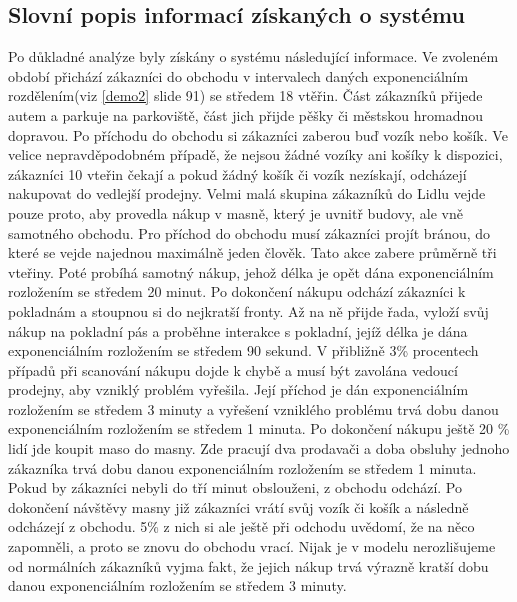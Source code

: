 \documentclass[12pt,a4paper,titlepage]{article}
\begin{document}
\subsection{Slovní popis informací získaných o systému}
Po důkladné analýze byly získány o systému následující informace. Ve zvoleném období přichází zákazníci do obchodu v intervalech daných exponenciálním rozdělením(viz \ref{demo2} slide 91) se středem 18 vtěřin. Část zákazníků přijede autem a parkuje na parkoviště, část jich přijde pěšky či městskou hromadnou dopravou. Po příchodu do obchodu si zákazníci zaberou buď vozík nebo košík. Ve velice nepravděpodobném případě, že nejsou žádné vozíky ani košíky k dispozici, zákazníci 10 vteřin čekají a pokud žádný košík či vozík nezískají, odcházejí nakupovat do vedlejší prodejny. Velmi malá skupina zákazníků do Lidlu vejde pouze proto, aby provedla nákup v masně, který je uvnitř budovy, ale vně samotného obchodu. Pro příchod do obchodu musí zákazníci projít bránou, do které se vejde najednou maximálně jeden člověk. Tato akce zabere průměrně tři vteřiny. Poté probíhá samotný nákup, jehož délka je opět dána exponenciálním rozložením se středem 20 minut. Po dokončení nákupu odchází zákazníci k pokladnám a stoupnou si do nejkratší fronty. Až na ně přijde řada, vyloží svůj nákup na pokladní pás a proběhne interakce s pokladní, jejíž délka je dána exponenciálním rozložením se středem 90 sekund. V přibližně 3\% procentech případů při scanování nákupu dojde k chybě a musí být zavolána vedoucí prodejny, aby vzniklý problém vyřešila. Její příchod je dán exponenciálním rozložením se středem 3 minuty a vyřešení vzniklého problému trvá dobu danou exponenciálním rozložením se středem 1 minuta. Po dokončení nákupu ještě 20 \% lidí jde koupit maso do masny. Zde pracují dva prodavači a doba obsluhy jednoho zákazníka trvá dobu danou exponenciálním rozložením se středem 1 minuta. Pokud by zákazníci nebyli do tří minut obslouženi, z obchodu odchází. Po dokončení návštěvy masny již zákazníci vrátí svůj vozík či košík a následně odcházejí z obchodu. 5\% z nich si ale ještě při odchodu uvědomí, že na něco zapomněli, a proto se znovu do  obchodu vrací. Nijak je v modelu nerozlišujeme od normálních zákazníků vyjma fakt, že jejich nákup trvá výrazně kratší dobu danou exponenciálním rozložením se středem 3 minuty.
\end{document}
